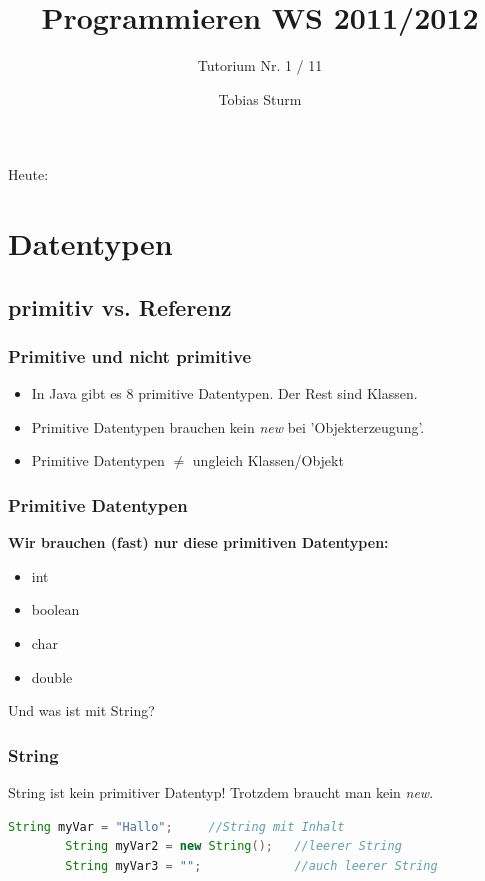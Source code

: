 \documentclass[18pt]{beamer}
\title[Proggen WS11/12]{Programmieren WS 2011/2012}
\subtitle{Tutorium Nr. 1 / 11}
\author{Tobias Sturm} %
\institute{Zertifizierbare Vertrauenswürdige Informatiksysteme}
\date[23.1.12] %
\begin{document}


\begin{frame}
	\titlepage
\end{frame}


\begin{frame}{Heute:}
	\tableofcontents
\end{frame}


\section{Datentypen}
\subsection{primitiv vs. Referenz}

\begin{frame}
	\frametitle{Primitive und nicht primitive}
	
	\begin{itemize}
		\item<1-> In Java gibt es 8 primitive Datentypen. Der Rest sind Klassen.
		\item<2-> Primitive Datentypen brauchen kein \emph{new} bei 'Objekterzeugung'.
		\item<3-> Primitive Datentypen $\neq$ ungleich Klassen/Objekt
	\end{itemize}
\end{frame}


\begin{frame}
	\frametitle{Primitive Datentypen}
	\textbf{Wir brauchen (fast) nur diese primitiven Datentypen:}
	\begin{itemize}
		\item int
		\item boolean
		\item char
		\item double
	\end{itemize}
	
	\pause
	Und was ist mit String?
\end{frame}


\begin{frame}[fragile]
	\frametitle{String}
	
	String ist kein primitiver Datentyp!
	Trotzdem braucht man kein \emph{new}.
	
	\begin{lstlisting}[language=java]
		String myVar = "Hallo";		//String mit Inhalt
		String myVar2 = new String(); 	//leerer String
		String myVar3 = ""; 			//auch leerer String
	\end{lstlisting}
\end{frame}
\end{document}
